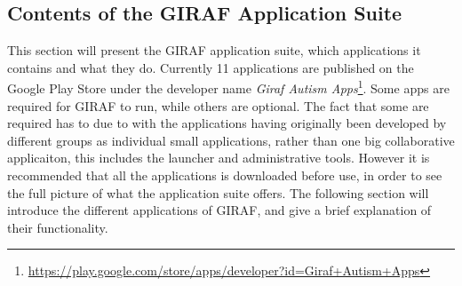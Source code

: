\subsection{Contents of the GIRAF Application Suite}
This section will present the GIRAF application suite, which applications it contains and what they do.
Currently 11 applications are published on the Google Play Store under the developer name \textit{Giraf Autism Apps}\footnote{\url{https://play.google.com/store/apps/developer?id=Giraf+Autism+Apps}}.
Some apps are required for GIRAF to run, while others are optional.
The fact that some are required has to due to with the applications having originally been developed by different groups as individual small applications, rather than one big collaborative applicaiton, this includes the launcher and administrative tools.
However it is recommended that all the applications is downloaded before use, in order to see the full picture of what the application suite offers.
The following section will introduce the different applications of GIRAF, and give a brief explanation of their functionality.
